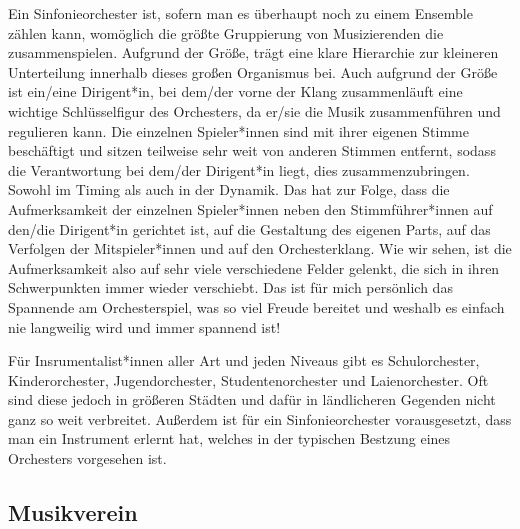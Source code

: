 Ein Sinfonieorchester ist, sofern man es überhaupt noch zu einem Ensemble zählen
kann, womöglich die größte Gruppierung von Musizierenden die zusammenspielen.
Aufgrund der Größe, trägt eine klare Hierarchie zur kleineren Unterteilung
innerhalb dieses großen Organismus bei. Auch aufgrund der Größe ist ein/eine Dirigent*in, bei
dem/der vorne der Klang zusammenläuft eine wichtige Schlüsselfigur des Orchesters,
da er/sie die Musik zusammenführen und regulieren kann. Die einzelnen Spieler*innen
sind mit ihrer eigenen Stimme beschäftigt und sitzen teilweise sehr weit von
anderen Stimmen entfernt, sodass die Verantwortung bei dem/der Dirigent*in
liegt, dies zusammenzubringen. Sowohl im Timing als auch in der Dynamik. Das hat
zur Folge, dass die Aufmerksamkeit der einzelnen Spieler*innen neben den
Stimmführer*innen auf den/die Dirigent*in gerichtet ist, auf die Gestaltung des
eigenen Parts, auf das Verfolgen der Mitspieler*innen und auf den
Orchesterklang. \autocite[56]{doerne:umfassend_musizieren} Wie wir sehen, ist
die Aufmerksamkeit also auf sehr viele verschiedene Felder gelenkt, die sich in
ihren Schwerpunkten immer wieder verschiebt. Das ist für mich persönlich das
Spannende am Orchesterspiel, was so viel Freude bereitet und weshalb es einfach
nie langweilig wird und immer spannend ist!

Für Insrumentalist*innen aller Art und jeden Niveaus gibt es Schulorchester,
Kinderorchester, Jugendorchester, Studentenorchester und Laienorchester. Oft
sind diese jedoch in größeren Städten und dafür in ländlicheren Gegenden nicht ganz so
weit verbreitet. Außerdem ist für ein Sinfonieorchester vorausgesetzt, dass man
ein Instrument erlernt hat, welches in der typischen Bestzung eines Orchesters
vorgesehen ist. 



\subsection{Musikverein}

